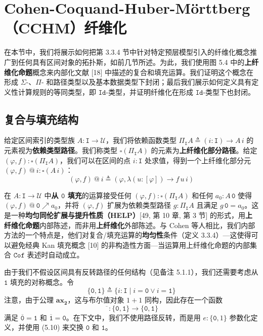 \documentclass{ctexrep}
\theoremstyle{plain}
\theoremstyle{definition}
\theoremstyle{remark}
\newcommand{\Cof}{\mathtt{Cof}}
\newcommand{\ttzero}{\mathtt{0}}
\newcommand{\ttone}{\mathtt{1}}
\newcommand{\ax}[1]{\mathbf{ax_{#1}}}
\begin{document}
\section{Cohen-Coquand-Huber-Mörttberg（CCHM）纤维化}

在本节中，我们将展示如何把第 3.3.4 节中针对特定预层模型引入的纤维化概念推广到任何具有区间对象的拓扑斯，如前几节所述。为此，我们使用图 5.4 中的\textbf{上纤维化命题}概念来内部化文献 [18] 中描述的复合和填充运算。我们证明这个概念在形成 $\Sigma$-、$\Pi$- 和路径类型以及基本数据类型下封闭；最后我们展示如何定义具有定义性计算规则的等同类型，即 $\mathtt{Id}$-类型，并证明纤维化在形成 $\mathtt{Id}$-类型下也封闭。

\subsection{复合与填充结构}

给定区间索引的类型族 $A : \mathtt{I} \to \mathcal{U}$，我们将依赖函数类型 $\Pi_\mathtt{I} A \triangleq (i : \mathtt{I}) \to A\,i$ 的元素视为\textbf{依赖类型路径}。我们称类型 $\square(\Pi_\mathtt{I} A)$ 的元素为\textbf{上纤维化部分路径}。给定 $(\varphi, f) : \square(\Pi_\mathtt{I} A)$，我们可以在区间的点 $i : \mathtt{I}$ 处求值，得到一个上纤维化部分元 $(\varphi, f) \ @\  i : \square(A\,i)$：
\begin{equation}
(\varphi, f) \ @\  i \triangleq (\varphi, \lambda(u : [\varphi]) \to f\,u\,i)
\end{equation}

在 $A : \mathtt{I} \to \mathcal{U}$ 中\textbf{从 $\ttzero$ 填充}的运算接受任何 $(\varphi, f) : \square(\Pi_\mathtt{I} A)$ 和任何 $a_0 : A\,\ttzero$ 使得 $(\varphi, f) \ @\  \ttzero \nearrow a_0$，并将 $(\varphi, f)$ 扩展为依赖类型路径 $g : \Pi_\mathtt{I} A$ 且满足 $g\,\ttzero = a_0$。这是一种\textbf{均匀同伦扩展与提升性质（HELP）}[49, 第 10 章, 第 3 节] 的形式，用\textbf{上纤维化命题}内部陈述，而非用\textbf{上纤维化}外部陈述。与 Cohen 等人相比，我们内部方法的一个特点是，他们对复合/填充运算的\textbf{均匀性}条件（定义 3.3.4）---这使得可以避免经典 Kan 填充概念 [10] 的非构造性方面---当运算用上纤维化命题的内部集合 $\Cof$ 表述时自动成立。

由于我们不假设区间具有反转路径的任何结构（见备注 5.1.1），我们还需要考虑从 $\ttone$ 填充的对称概念。令
\begin{equation}
\{\ttzero, \ttone\} \triangleq \{i : \mathtt{I} \mid i = \ttzero \lor i = \ttone\}
\end{equation}
注意，由于公理 $\ax{2}$，这与布尔值对象 $1 + 1$ 同构，因此存在一个函数
\begin{equation}
\overline{\phantom{x}} : \{\ttzero, \ttone\} \to \{\ttzero, \ttone\}
\end{equation}
满足 $\overline{\ttzero} = \ttone$ 和 $\overline{\ttone} = \ttzero$。在下文中，我们不使用路径反转，而是用 $e : \{\ttzero, 1\}$ 参数化定义，并使用 (5.10) 来交换 $\ttzero$ 和 $\ttone$。
\end{document}

